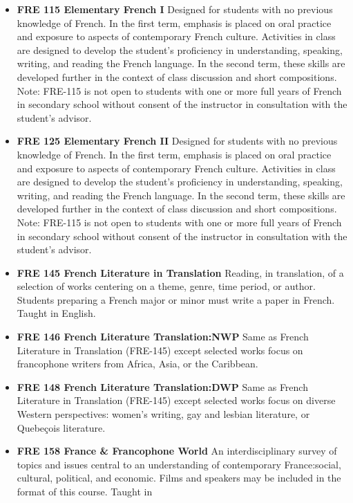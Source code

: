 \documentclass[
  letterpaper,
]{scrbook}
\providecommand{\tightlist}{%
  \setlength{\itemsep}{0pt}\setlength{\parskip}{0pt}}
\begin{document}
\begin{itemize}
\tightlist
\item
  \textbf{FRE 115 Elementary French I} Designed for students with no
  previous knowledge of French. In the first term, emphasis is placed on
  oral practice and exposure to aspects of contemporary French culture.
  Activities in class are designed to develop the student's proficiency
  in understanding, speaking, writing, and reading the French language.
  In the second term, these skills are developed further in the context
  of class discussion and short compositions. Note: FRE-115 is not open
  to students with one or more full years of French in secondary school
  without consent of the instructor in consultation with the student's
  advisor.
\item
  \textbf{FRE 125 Elementary French II} Designed for students with no
  previous knowledge of French. In the first term, emphasis is placed on
  oral practice and exposure to aspects of contemporary French culture.
  Activities in class are designed to develop the student's proficiency
  in understanding, speaking, writing, and reading the French language.
  In the second term, these skills are developed further in the context
  of class discussion and short compositions. Note: FRE-115 is not open
  to students with one or more full years of French in secondary school
  without consent of the instructor in consultation with the student's
  advisor.
\item
  \textbf{FRE 145 French Literature in Translation} Reading, in
  translation, of a selection of works centering on a theme, genre, time
  period, or author. Students preparing a French major or minor must
  write a paper in French. Taught in English.
\item
  \textbf{FRE 146 French Literature Translation:NWP} Same as French
  Literature in Translation (FRE-145) except selected works focus on
  francophone writers from Africa, Asia, or the Caribbean.
\item
  \textbf{FRE 148 French Literature Translation:DWP} Same as French
  Literature in Translation (FRE-145) except selected works focus on
  diverse Western perspectives: women's writing, gay and lesbian
  literature, or Quebeçois literature.
\item
  \textbf{FRE 158 France \& Francophone World} An interdisciplinary
  survey of topics and issues central to an understanding of
  contemporary France:social, cultural, political, and economic. Films
  and speakers may be included in the format of this course. Taught in

\end{itemize}
\end{document}
